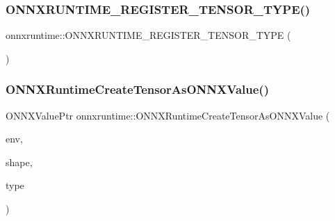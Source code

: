 \mbox{\label{namespaceonnxruntime_a5f773a1e28834eac53a2082c9cbfda8e}} 
\subsubsection{\texorpdfstring{O\+N\+N\+X\+R\+U\+N\+T\+I\+M\+E\+\_\+\+R\+E\+G\+I\+S\+T\+E\+R\+\_\+\+T\+E\+N\+S\+O\+R\+\_\+\+T\+Y\+P\+E()}{ONNXRUNTIME\_REGISTER\_TENSOR\_TYPE()}\hspace{0.1cm}{\footnotesize\ttfamily [13/13]}}
{\footnotesize\ttfamily onnxruntime\+::\+O\+N\+N\+X\+R\+U\+N\+T\+I\+M\+E\+\_\+\+R\+E\+G\+I\+S\+T\+E\+R\+\_\+\+T\+E\+N\+S\+O\+R\+\_\+\+T\+Y\+PE (\begin{DoxyParamCaption}\item[{\mbox{\hyperlink{uniononnxruntime_1_1MLFloat16}{M\+L\+Float16}}}]{ }\end{DoxyParamCaption})}

\mbox{\label{namespaceonnxruntime_a2b7951372d06d39431033e6036bb06a9}} 
\subsubsection{\texorpdfstring{O\+N\+N\+X\+Runtime\+Create\+Tensor\+As\+O\+N\+N\+X\+Value()}{ONNXRuntimeCreateTensorAsONNXValue()}}
{\footnotesize\ttfamily O\+N\+N\+X\+Value\+Ptr onnxruntime\+::\+O\+N\+N\+X\+Runtime\+Create\+Tensor\+As\+O\+N\+N\+X\+Value (\begin{DoxyParamCaption}\item[{\mbox{\hyperlink{visibility__macros_8h_a198d136b8176ee5824b09c7bd8b7beb0}{\+\_\+\+Inout\+\_\+}} \mbox{\hyperlink{session_2allocator_8h_a9eb4a70849a17d41aca1955b07cdfaca}{O\+N\+N\+X\+Runtime\+Allocator}} $\ast$}]{env,  }\item[{const std\+::vector$<$ \mbox{\hyperlink{mlasi_8h_a503efbc1c6e50825320ad909366b78ab}{size\+\_\+t}} $>$ \&}]{shape,  }\item[{\mbox{\hyperlink{tensor__type__and__shape__c__api_8h_acc48f6a9c9e4d7071352e45ce13324b3}{Onnx\+Runtime\+Tensor\+Element\+Data\+Type}}}]{type }\end{DoxyParamCaption})\hspace{0.3cm}{\ttfamily [inline]}}

